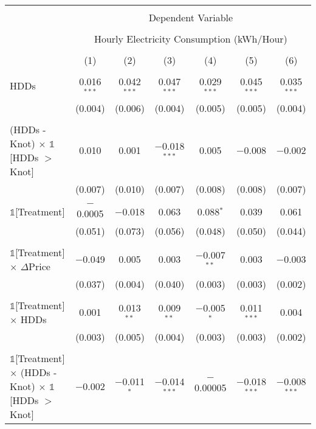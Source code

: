 
\begin{table}[!htbp] \centering 
  \label{Table:Breakdown-of-Average-Treatement-Effects-in-the-Peak-Rate-Period_As-a-Function-of-Rate-Changes} 
\scriptsize 
\begin{longtable}{@{\extracolsep{15pt}}lcccccc} 
\\[-1.8ex]\hline 
\hline \\[-1.8ex] 
 & \multicolumn{6}{c}{Dependent Variable} \\ 
\cline{2-7} 
\\[-1.8ex] & \multicolumn{6}{c}{Hourly Electricity Consumption  (kWh/Hour)} \\ 
\\[-1.8ex] & (1) & (2) & (3) & (4) & (5) & (6)\\ 
\hline \\[-1.8ex] \endhead
 HDDs & 0.016$^{***}$ & 0.042$^{***}$ & 0.047$^{***}$ & 0.029$^{***}$ & 0.045$^{***}$ & 0.035$^{***}$ \\ 
  & (0.004) & (0.006) & (0.004) & (0.005) & (0.005) & (0.004) \\ 
  & & & & & & \\ 
 (HDDs - Knot) $\times$ $\mathbb{1}$[HDDs $>$ Knot] & 0.010 & 0.001 & $-$0.018$^{***}$ & 0.005 & $-$0.008 & $-$0.002 \\ 
  & (0.007) & (0.010) & (0.007) & (0.008) & (0.008) & (0.007) \\ 
  & & & & & & \\ 
 $\mathbb{1}$[Treatment] & $-$0.0005 & $-$0.018 & 0.063 & 0.088$^{*}$ & 0.039 & 0.061 \\ 
  & (0.051) & (0.073) & (0.056) & (0.048) & (0.050) & (0.044) \\ 
  & & & & & & \\ 
 $\mathbb{1}$[Treatment] $\times$ $\Delta$Price & $-$0.049 & 0.005 & 0.003 & $-$0.007$^{**}$ & 0.003 & $-$0.003 \\ 
  & (0.037) & (0.004) & (0.040) & (0.003) & (0.003) & (0.002) \\ 
  & & & & & & \\ 
 $\mathbb{1}$[Treatment] $\times$ HDDs & 0.001 & 0.013$^{**}$ & 0.009$^{**}$ & $-$0.005$^{*}$ & 0.011$^{***}$ & 0.004 \\ 
  & (0.003) & (0.005) & (0.004) & (0.003) & (0.003) & (0.002) \\ 
  & & & & & & \\ 
 $\mathbb{1}$[Treatment] $\times$ (HDDs - Knot) $\times$ $\mathbb{1}$[HDDs $>$ Knot] & $-$0.002 & $-$0.011$^{*}$ & $-$0.014$^{***}$ & $-$0.00005 & $-$0.018$^{***}$ & $-$0.008$^{***}$ \\ 

\end{longtable}
\end{table}
